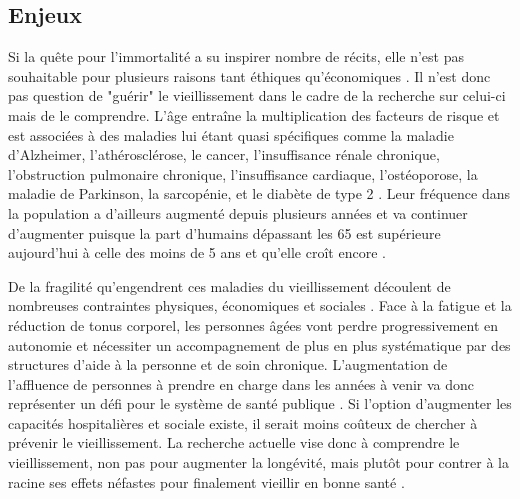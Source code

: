 \subsection{Enjeux}

Si la quête pour l'immortalité a su inspirer nombre de récits, elle n'est pas souhaitable pour plusieurs raisons tant éthiques qu'économiques \cite{Hayflick2000}. Il n'est donc pas question de "guérir" le vieillissement dans le cadre de la recherche sur celui-ci mais de le comprendre. L'âge entraîne la multiplication des facteurs de risque et est associées à des maladies lui étant quasi spécifiques comme la maladie d'Alzheimer, l'athérosclérose, le cancer, l'insuffisance rénale chronique, l'obstruction pulmonaire chronique, l'insuffisance cardiaque, l'ostéoporose, la maladie de Parkinson, la sarcopénie, et le diabète de type 2 \cite{Kubben2017}. Leur fréquence dans la population a d'ailleurs augmenté depuis plusieurs années et va continuer d'augmenter puisque la part d'humains dépassant les 65 est supérieure aujourd'hui à celle des moins de 5 ans et qu'elle croît encore \cite{Phillips2021Apr}. 

De la fragilité qu'engendrent ces maladies du vieillissement découlent de nombreuses contraintes physiques, économiques et sociales \cite{Blasimme2017Feb}. Face à la fatigue et la réduction de tonus corporel, les personnes âgées vont perdre progressivement en autonomie et nécessiter un accompagnement de plus en plus systématique par des structures d'aide à la personne et de soin chronique. L'augmentation de l'affluence de personnes à prendre en charge dans les années à venir va donc représenter un défi pour le système de santé publique \cite{Phillips2021Apr}. Si l'option d'augmenter les capacités hospitalières et sociale existe, il serait moins coûteux de chercher à prévenir le vieillissement. La recherche actuelle vise donc à comprendre le vieillissement, non pas pour augmenter la longévité, mais plutôt pour contrer à la racine ses effets néfastes pour finalement vieillir en bonne santé \cite{Ferrucci2020Feb}.




